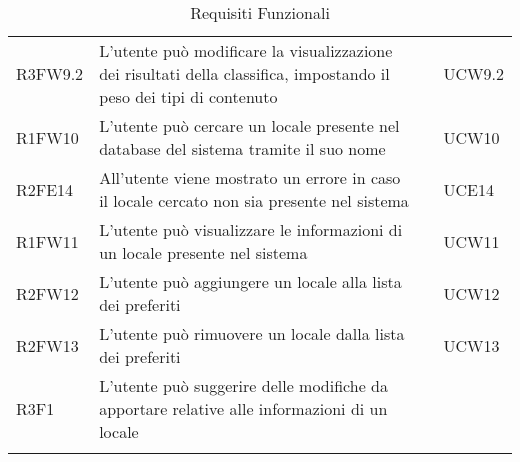 \begin{longtable}{ m{}<{\centering}  m{}<{\centering}  m{}<{\centering}  m{}<{\centering}}
	R3FW9.2 & L’utente può modificare la visualizzazione dei risultati della classifica, impostando il peso dei tipi di contenuto & \Fa & UCW9.2\\	  
	 
	R1FW10 & L’utente può cercare un locale presente nel database del sistema tramite il suo nome & \Ob & UCW10 \\	 
	 
	R2FE14 & All’utente viene mostrato un errore in caso il locale cercato non sia presente nel sistema & \De & UCE14\\	 
	 	 
	R1FW11 & L’utente può visualizzare le informazioni di un locale presente nel sistema & \Ob & UCW11\\	 	 	 	

	R2FW12 & L’utente può aggiungere un locale alla lista dei preferiti & \De &  UCW12\\

	R2FW13 & L’utente può rimuovere un locale dalla lista dei preferiti & \De & UCW13\\

	R3F1 & L’utente può suggerire delle modifiche da apportare relative alle informazioni di un locale & \Fa & \Di \\

	\hiderowcolors \caption{Requisiti Funzionali}
\end{longtable}

\clearpage